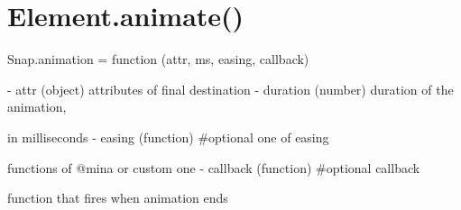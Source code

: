 \section{Element.animate()}
 Snap.animation = function (attr, ms, easing, callback) 

- attr (object) attributes of final destination
- duration (number) duration of the animation, 

in milliseconds
- easing (function) \#optional one of easing 

functions of @mina or custom one
- callback (function) \#optional callback 

function that fires when animation ends




